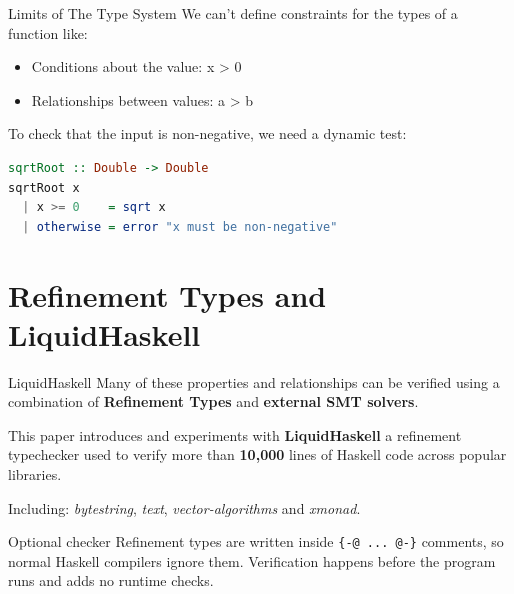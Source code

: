 \documentclass[aspectratio=169]{beamer}
\let\originaltexttt\texttt
\renewcommand{\texttt}[1]{%
  \begingroup
  \setlength{\fboxsep}{2pt}%
  \colorbox{themeTrack!65}{%
    \textcolor{themeText}{\originaltexttt{#1}}%
  }%
  \endgroup
}
\begin{document}
\begin{frame}[fragile]{Limits of The Type System}
	We can't define constraints for the types of a function like:

	\begin{itemize}
		\item Conditions about the value: x > 0
		\item Relationships between values: a > b
	\end{itemize}

	To check that the input is non-negative, we need a dynamic test:

	\begin{lstlisting}[language=Haskell]
sqrtRoot :: Double -> Double
sqrtRoot x
  | x >= 0    = sqrt x
  | otherwise = error "x must be non-negative"
\end{lstlisting}
\end{frame}

\section{Refinement Types and LiquidHaskell}

\begin{frame}[fragile]{LiquidHaskell}
	Many of these properties and relationships can be verified using a combination of \textbf{Refinement Types} and \textbf{external SMT solvers}.

	This paper introduces and experiments with \textbf{LiquidHaskell} a refinement typechecker used to verify more than \textbf{10,000} lines of Haskell code across popular libraries.

	Including: \emph{bytestring}, \emph{text}, \emph{vector-algorithms} and \emph{xmonad}.

	\begin{exampleblock}{Optional checker}
		\vspace{0.1em}
		Refinement types are written inside \texttt{\{-@ ... @-\}} comments, so normal Haskell compilers ignore them. Verification happens before the program runs and adds no runtime checks.
	\end{exampleblock}
\end{frame}
\end{document}
